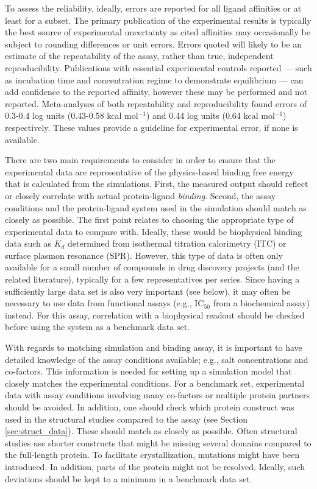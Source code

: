\documentclass[9pt,bestpractices]{livecoms}
\begin{document}
To assess the reliability, ideally, errors are reported for all ligand affinities or at least for a subset. The primary publication of the experimental results is typically the best source of experimental uncertainty as cited affinities may occasionally be subject to rounding differences or unit errors\cite{kramer2012experimental}. Errors quoted will likely to be an estimate of the repeatability of the assay, rather than true, independent reproducibility. Publications with essential experimental controls reported --- such as incubation time and concentration regime to demonstrate equilibrium --- can add confidence to the reported affinity, however these may be performed and not reported\cite{jarmoskaite2020measure}. Meta-analyses of both repeatability\cite{sheridan2020experimental} and reproducibility\cite{kramer2012experimental} found errors of 0.3-0.4 log units (0.43-0.58 kcal mol$^{-1}$) and 0.44 log units (0.64 kcal mol$^{-1}$) respectively. These values provide a guideline for experimental error, if none is available.

There are two main requirements to consider in order to ensure that the experimental data are representative of the physics-based binding free energy that is calculated from the simulations. First, the measured output should reflect or closely correlate with actual protein-ligand \emph{binding}. Second, the assay conditions and the protein-ligand system used in the simulation should match as closely as possible. The first point relates to choosing the appropriate type of experimental data to compare with. Ideally, these would be biophysical binding data such as $K_d$ determined from isothermal titration calorimetry (ITC) or surface plasmon resonance (SPR). However, this type of data is often only available for a small number of compounds in drug discovery projects (and the related literature), typically for a few representatives per series. Since having a sufficiently large data set is also very important (see below), it may often be necessary to use data from functional assays (e.g., IC$_{50}$ from a biochemical assay) instead. For this assay, correlation with a biophysical readout should be checked before using the system as a benchmark data set.

With regards to matching simulation and binding assay, it is important to have detailed knowledge of the assay conditions available; e.g., salt concentrations and co-factors. This information is needed for setting up a simulation model that closely matches the experimental conditions. For a benchmark set, experimental data with assay conditions involving many co-factors or multiple protein partners should be avoided. In addition, one should check which protein construct was used in the structural studies compared to the assay (see Section \ref{sec:struct_data}). These should match as closely as possible. Often structural studies use shorter constructs that might be missing several domains compared to the full-length protein. To facilitate crystallization, mutations might have been introduced. In addition, parts of the protein might not be resolved. Ideally, such deviations should be kept to a minimum in a benchmark data set.
\end{document}
